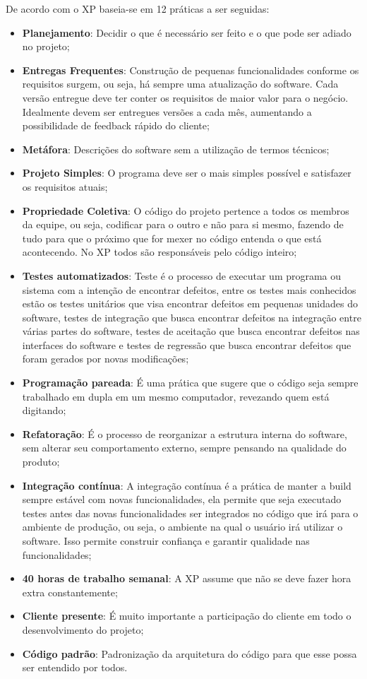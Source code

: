 De acordo com \cite{beck} o XP baseia-se em 12 práticas a ser seguidas:

\begin{itemize}
  \item \textbf{Planejamento}: Decidir o que é necessário ser feito e o que pode ser adiado no projeto;
  \item \textbf{Entregas Frequentes}: Construção de pequenas funcionalidades conforme os requisitos surgem, ou seja, há sempre uma atualização do software. Cada versão entregue deve ter conter os requisitos de maior valor para o negócio. Idealmente devem ser entregues versões a cada mês, aumentando a possibilidade de feedback rápido do cliente;
  \item \textbf{Metáfora}: Descrições do software sem a utilização de termos técnicos;
  \item \textbf{Projeto Simples}: O programa deve ser o mais simples possível e satisfazer os requisitos atuais;
  \item \textbf{Propriedade Coletiva}: O código do projeto pertence a todos os membros da equipe, ou seja, codificar para o outro e não para si mesmo, fazendo de tudo para que o próximo que for mexer no código entenda o que está acontecendo. No XP todos são responsáveis pelo código inteiro;
  \item \textbf{Testes automatizados}: Teste é o processo de executar um programa ou sistema com a intenção de encontrar defeitos, entre os testes mais conhecidos estão os testes unitários que visa encontrar defeitos em pequenas unidades do software, testes de integração que busca encontrar defeitos na integração entre várias partes do software, testes de aceitação que busca encontrar defeitos nas interfaces do software e testes de regressão que busca encontrar defeitos que foram gerados por novas modificações;
  \item \textbf{Programação pareada}: É uma prática que sugere que o código seja sempre trabalhado em dupla em um mesmo computador, revezando quem está digitando;
  \item \textbf{Refatoração}: É o processo de reorganizar a estrutura interna do software, sem alterar seu comportamento externo, sempre pensando na qualidade do produto;
  \item \textbf{Integração contínua}: A integração contínua é a prática de manter a build sempre estável com novas funcionalidades, ela permite que seja executado testes antes das novas funcionalidades ser integrados no código que irá para o ambiente de produção, ou seja, o ambiente na qual o usuário irá utilizar o software. Isso permite construir confiança e garantir qualidade nas funcionalidades;
  \item \textbf{40 horas de trabalho semanal}:  A XP assume que não se deve fazer hora extra constantemente;
  \item \textbf{Cliente presente}: É muito importante a participação do cliente em todo o desenvolvimento do projeto;
  \item \textbf{Código padrão}: Padronização da arquitetura do código para que esse possa ser entendido por todos.
\end{itemize}

